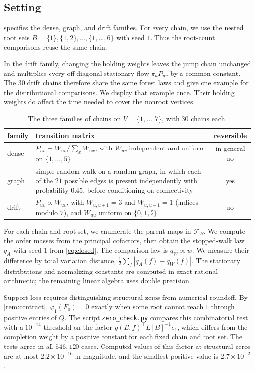 \documentclass[onefignum,onetabnum]{siamart250211}
\numberwithin{theorem}{section}
\numberwithin{equation}{section}
\newcommand{\Fset}{\mathcal{F}}
\begin{document}
\subsection{Setting}\label{sec:sm-numerics}
 specifies the dense, graph, and drift families.
For every chain, we use the nested root sets
$B=\{1\},\{1,2\},\dots,\{1,\dots,6\}$ with seed $1$. Thus the
root-count comparisons reuse the same chain.

In the drift family, changing the holding weights leaves the jump
chain unchanged and multiplies every off-diagonal stationary flow
$\pi_uP_{uv}$ by a common constant. The $30$ drift chains therefore
share the same forest laws and give one example for the distributional
comparisons. We display that example once. Their holding weights do
affect the time needed to cover the nonroot vertices.

\begin{table}[!htbp]
\caption{The three families of chains on $V=\{1,\dots,7\}$, with $30$
chains each.}\label{tab:families}
\centering
\small
\begin{tabular}{@{}l>{\raggedright\arraybackslash}p{8.2cm}c@{}}
\toprule
family & transition matrix & reversible\\
\midrule
dense & $P_{uv}=W_{uv}/\sum_{x}W_{ux}$, with $W_{uv}$ independent and
uniform on $\{1,\dots,5\}$ & in general no\\
\addlinespace[2pt]
graph & simple random walk on a random graph, in which each of the $21$
possible edges is present independently with probability $0.45$, before
conditioning on connectivity & yes\\
\addlinespace[2pt]
drift & $P_{uv}\propto W_{uv}$, with $W_{u,u+1}=3$ and $W_{u,u-1}=1$
(indices modulo $7$), and $W_{uu}$ uniform on $\{0,1,2\}$ & no\\
\bottomrule
\end{tabular}
\end{table}

For each chain and root set, we enumerate the parent maps in
$\Fset_B$. We compute the order masses from the principal cofactors,
then obtain the stopped-walk law $q_A$ with seed $1$ from
\eqref{eq:closed}. The comparison law is $q_W\propto w$. We measure
their difference by total variation distance,
$\tfrac12\sum_f|q_A(f)-q_W(f)|$. The stationary distributions and
normalizing constants are computed in exact rational arithmetic;
the remaining linear algebra uses double precision.

Support loss requires distinguishing structural zeros from numerical
roundoff. By \cref{rem:contract}, $\varphi_1(F_0)=0$ exactly when some
root cannot reach $1$ through positive entries of $Q$. The script
\nolinkurl{zero_check.py} compares this combinatorial test
with a $10^{-14}$ threshold on the factor
$g(B,f)^{\top}L[B]^{-1}e_1$, which differs from the completion weight
by a positive constant for each fixed chain and root set. The tests
agree in all $546{,}120$ cases. Computed values of this factor at
structural zeros are at most $2.2\times10^{-16}$ in magnitude, and
the smallest positive value is $2.7\times10^{-2}$.
\end{document}
